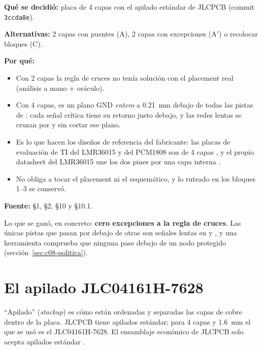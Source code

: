 \begin{decision}
\textbf{Qué se decidió:} placa de 4 capas con el apilado estándar de JLCPCB (commit \texttt{3ccda8e}).

\textbf{Alternativas:} 2 capas con puentes (A), 2 capas con excepciones (A$'$) o recolocar bloques (C).

\textbf{Por qué:}
\begin{itemize}
  \item Con 2 capas la regla de cruces no tenía solución con el placement real (análisis a mano + oráculo).
  \item Con 4 capas,  es un plano GND \emph{entero} a \SI{0.21}{\milli\meter} debajo de todas las pistas
  de : cada señal crítica tiene su retorno justo debajo, y las redes lentas se cruzan por  y
   sin cortar ese plano.
  \item Es lo que hacen los diseños de referencia del fabricante: las placas de evaluación de TI del LMR36015 y del
  PCM1808 son de 4 capas , y el propio datasheet del LMR36015 une los dos pines  por una capa
  interna .
  \item No obliga a tocar el placement ni el esquemático, y lo ruteado en los bloques 1--3 se conservó.
\end{itemize}

\textbf{Fuente:}  §1, §2, §10 y §10.1.
\end{decision}

Lo que se ganó, en concreto: \textbf{cero excepciones a la regla de cruces}. Las únicas pistas que pasan por debajo
de otras son señales lentas en  y , y una herramienta comprueba que ninguna pase debajo de un
nodo protegido (sección~\ref{sec:c08-politica}).

\section{El apilado JLC04161H-7628}\label{sec:c08-apilado}

``Apilado'' (\emph{stackup}) es cómo están ordenadas y separadas las capas de cobre dentro de la placa. JLCPCB tiene
apilados estándar; para 4 capas y \SI{1.6}{\milli\meter} el que se usó es el JLC04161H-7628. El ensamblaje económico
de JLCPCB solo acepta apilados estándar .

